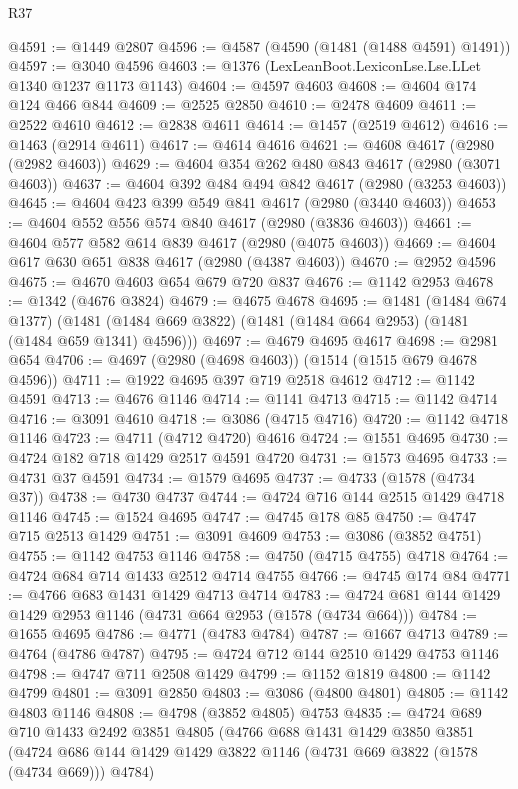 \begin{lexlean}{R37}
\begin{coremodule}
@4591 := @1449 @2807
@4596 := @4587 (@4590 (@1481 (@1488 @4591) @1491))
@4597 := @3040 @4596
@4603 := @1376 (LexLeanBoot.LexiconLse.Lse.LLet @1340 @1237 @1173 @1143)
@4604 := @4597 @4603
@4608 := @4604 @174 @124 @466 @844
@4609 := @2525 @2850
@4610 := @2478 @4609
@4611 := @2522 @4610
@4612 := @2838 @4611
@4614 := @1457 (@2519 @4612)
@4616 := @1463 (@2914 @4611)
@4617 := @4614 @4616
@4621 := @4608 @4617 (@2980 (@2982 @4603))
@4629 := @4604 @354 @262 @480 @843 @4617 (@2980 (@3071 @4603))
@4637 := @4604 @392 @484 @494 @842 @4617 (@2980 (@3253 @4603))
@4645 := @4604 @423 @399 @549 @841 @4617 (@2980 (@3440 @4603))
@4653 := @4604 @552 @556 @574 @840 @4617 (@2980 (@3836 @4603))
@4661 := @4604 @577 @582 @614 @839 @4617 (@2980 (@4075 @4603))
@4669 := @4604 @617 @630 @651 @838 @4617 (@2980 (@4387 @4603))
@4670 := @2952 @4596
@4675 := @4670 @4603 @654 @679 @720 @837
@4676 := @1142 @2953
@4678 := @1342 (@4676 @3824)
@4679 := @4675 @4678
@4695 := @1481
    (@1484 @674 @1377)
    (@1481 (@1484 @669 @3822) (@1481 (@1484 @664 @2953) (@1481 (@1484 @659 @1341) @4596)))
@4697 := @4679 @4695 @4617
@4698 := @2981 @654
@4706 := @4697 (@2980 (@4698 @4603)) (@1514 (@1515 @679 @4678 @4596))
@4711 := @1922 @4695 @397 @719 @2518 @4612
@4712 := @1142 @4591
@4713 := @4676 @1146
@4714 := @1141 @4713
@4715 := @1142 @4714
@4716 := @3091 @4610
@4718 := @3086 (@4715 @4716)
@4720 := @1142 @4718 @1146
@4723 := @4711 (@4712 @4720) @4616
@4724 := @1551 @4695
@4730 := @4724 @182 @718 @1429 @2517 @4591 @4720
@4731 := @1573 @4695
@4733 := @4731 @37 @4591
@4734 := @1579 @4695
@4737 := @4733 (@1578 (@4734 @37))
@4738 := @4730 @4737
@4744 := @4724 @716 @144 @2515 @1429 @4718 @1146
@4745 := @1524 @4695
@4747 := @4745 @178 @85
@4750 := @4747 @715 @2513 @1429
@4751 := @3091 @4609
@4753 := @3086 (@3852 @4751)
@4755 := @1142 @4753 @1146
@4758 := @4750 (@4715 @4755) @4718
@4764 := @4724 @684 @714 @1433 @2512 @4714 @4755
@4766 := @4745 @174 @84
@4771 := @4766 @683 @1431 @1429 @4713 @4714
@4783 := @4724 @681 @144 @1429 @1429 @2953 @1146 (@4731 @664 @2953 (@1578 (@4734 @664)))
@4784 := @1655 @4695
@4786 := @4771 (@4783 @4784)
@4787 := @1667 @4713
@4789 := @4764 (@4786 @4787)
@4795 := @4724 @712 @144 @2510 @1429 @4753 @1146
@4798 := @4747 @711 @2508 @1429
@4799 := @1152 @1819
@4800 := @1142 @4799
@4801 := @3091 @2850
@4803 := @3086 (@4800 @4801)
@4805 := @1142 @4803 @1146
@4808 := @4798 (@3852 @4805) @4753
@4835 := @4724
    @689
    @710
    @1433
    @2492
    @3851
    @4805
    (@4766
      @688
      @1431
      @1429
      @3850
      @3851
      (@4724 @686 @144 @1429 @1429 @3822 @1146 (@4731 @669 @3822 (@1578 (@4734 @669))) @4784)

\end{coremodule}
\end{lexlean}
